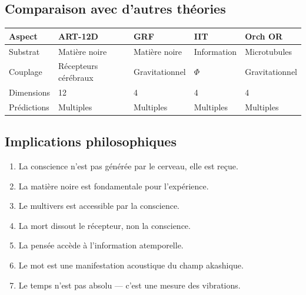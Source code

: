 \documentclass[11pt,a4paper]{article}
\begin{document}
\subsection{Comparaison avec d'autres théories}
\begin{table}[H]
\centering
\begin{tabular}{@{}lllll@{}}
\toprule
\textbf{Aspect} & \textbf{ART-12D} & \textbf{GRF} & \textbf{IIT} & \textbf{Orch OR} \\ \midrule
Substrat & Matière noire & Matière noire & Information & Microtubules \\
Couplage & Récepteurs cérébraux & Gravitationnel & $\Phi$ & Gravitationnel \\
Dimensions & 12 & 4 & 4 & 4 \\
Prédictions & Multiples & Multiples & Multiples & Multiples \\ \bottomrule
\end{tabular}
\end{table}

\subsection{Implications philosophiques}
\begin{enumerate}
    \item La conscience n'est pas générée par le cerveau, elle est reçue.
    \item La matière noire est fondamentale pour l'expérience.
    \item Le multivers est accessible par la conscience.
    \item La mort dissout le récepteur, non la conscience.
    \item La pensée accède à l'information atemporelle.
    \item Le mot est une manifestation acoustique du champ akashique.
    \item Le temps n'est pas absolu --- c'est une mesure des vibrations.
\end{enumerate}
\end{document}
